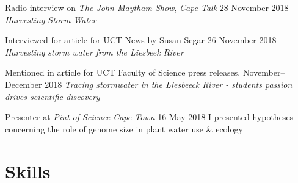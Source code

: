\documentclass[10pt]{article}
\begin{document}
\begin{hangparas}{2em}{1}


Radio interview on \textit{The John Maytham Show}, \textit{Cape Talk}
                                         \hfill {\small 28 November 2018} \break
\textit{Harvesting Storm Water}

Interviewed for article for UCT News by Susan Segar
                                         \hfill {\small 26 November 2018} \break
\textit{Harvesting storm water from the Liesbeek River}

Mentioned in article for UCT Faculty of Science press releases.
                                  \hfill {\small November--December 2018} \break
\textit{Tracing stormwater in the Liesbeeck River - students passion drives
scientific discovery}

Presenter at \href{http://pintofsciencesa.wixsite.com/pintofsciencesa/uct-planet-earth-16}
{\textit{Pint of Science Cape Town}}          \hfill {\small 16 May 2018} \break
I presented hypotheses concerning the role of genome size in plant water use 
\& ecology

\end{hangparas}

\vfill

\hrulefill

\clearpage

\section*{Skills} %
\end{document}
